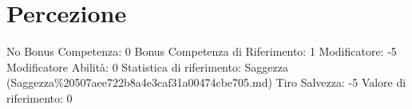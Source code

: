 \section{Percezione}\label{percezione}

\begin{description}
\tightlist
\item[Tags: ABI]
No Bonus Competenza: 0 Bonus Competenza di Riferimento: 1 Modificatore:
-5 Modificatore Abilità: 0 Statistica di riferimento: Saggezza
(Saggezza\%20507aee722b8a4e3caf31a00474cbe705.md) Tiro Salvezza: -5
Valore di riferimento: 0
\end{description}
